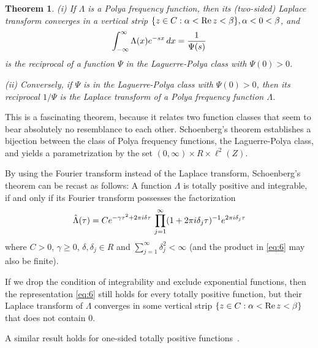 \documentclass{article}
\newtheorem{tm}{Theorem}
\newcommand{\fif}{if and only if}
\newtheorem{tm}{Theorem}
\providecommand{\*}{{\opl}}
\newcommand{\field}[1]{#1}
\newcommand{\bR}{\field{R}}
\newcommand{\bZ}{\field{Z}}
\newcommand{\bC}{\field{C}}
\newcommand{\<}{}
\newcommand{\>}{}
\newcommand{\inv}{^{- 1}}
\newcommand{\tp}{totally positive}
\newcommand{\lpc}{Laguerre-Polya class}
\newcommand{\pff}{Polya frequency function}
\begin{document}
\begin{tm}
  \label{tm:tp}(i) If $\Lambda$ is a Polya frequency function, then its
  (two-sided) Laplace transform converges in a vertical strip $\{z \in \bC :
  \alpha < \mathrm{Re} \hspace{0.17em} z < \beta\}, \alpha < 0 < \beta$, and
  \begin{equation}
    \label{eq:5} \int_{- \infty}^{\infty} \Lambda (x) e^{- sx} 
    \hspace{0.17em} dx = \frac{1}{\Psi (s)}
  \end{equation}
  is the reciprocal of a function $\Psi$ in the {\lpc} with $\Psi (0) > 0$.
  
  (ii) Conversely, if $\Psi$ is in the {\lpc} with $\Psi (0) > 0$, then its
  reciprocal $1 / \Psi$ is the Laplace transform of a Polya frequency function
  $\Lambda$.
\end{tm}

This is a fascinating theorem, because it relates two function classes that
seem to bear absolutely no resemblance to each other. Schoenberg's theorem
establishes a bijection between the class of {\pff}s, the {\lpc}, and yields a
parametrization by the set $(0, \infty) \times \bR \times \ell^2 (\bZ)$.

By using the Fourier transform instead of the Laplace transform, Schoenberg's
theorem can be recast as follows: A function $\Lambda$ is {\tp} and
integrable, {\fif} its Fourier transform possesses the factorization
\begin{equation}
  \label{eq:6} \hat{\Lambda} (\tau) = Ce^{- \gamma \tau^2 + 2 \pi i \delta
  \tau}  \hspace{0.17em} \prod_{j = 1}^{\infty} (1 + 2 \pi i \delta_j \tau)
  \inv e^{2 \pi i \delta_j \tau}
\end{equation}
where $C > 0$, $\gamma \geq 0$, $\delta, \delta_j \in \bR$ and $\sum_{j =
1}^{\infty} \delta_j^2 < \infty$ (and the product in \eqref{eq:6} may also be
finite).

If we drop the condition of integrability and exclude exponential functions,
then the representation \eqref{eq:6} still holds for every {\tp} function, but
their Laplace transform of $\Lambda$ converges in some vertical strip $\{z \in
\bC : \alpha < \mathrm{Re} \hspace{0.17em} z < \beta\}$ that does not contain
$0$.

A similar result holds for one-sided {\tp} functions~{\cite[Thm.~2]{sch51}}.
\end{document}
